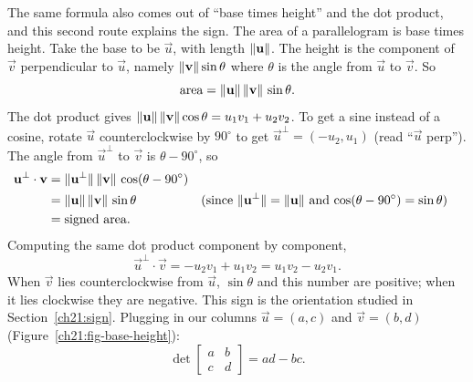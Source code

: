 The same formula also comes out of ``base times height'' and the dot product, and
this second route explains the sign. The area of a parallelogram is
base times height. Take the base to be $\vec u$, with length $\lVert\mathbf{u}\rVert$. The
height is the component of $\vec v$ perpendicular to $\vec u$, namely
$\lVert\mathbf{v}\rVert\sin\theta$ where $\theta$ is the angle from $\vec u$ to $\vec v$.
So
\[
  \text{area} = \lVert\mathbf{u}\rVert\,\lVert\mathbf{v}\rVert\,\sin\theta.
\]
The dot product gives $\lVert\mathbf{u}\rVert\,\lVert\mathbf{v}\rVert\cos\theta =
u_1 v_1 + u_2 v_2$. To get a sine instead of a cosine, rotate $\vec u$
counterclockwise by $90^\circ$ to get $\vec u^{\perp} = (-u_2, u_1)$ (read ``$\vec u$
perp''). The angle from $\vec u^\perp$ to $\vec v$ is $\theta - 90^\circ$, so
\begin{align*}
  \mathbf{u}^{\perp}\cdot \mathbf{v}
  &= \lVert\mathbf{u}^\perp\rVert\,\lVert\mathbf{v}\rVert\,\cos(\theta-90^\circ) \\
  &= \lVert\mathbf{u}\rVert\,\lVert\mathbf{v}\rVert\,\sin\theta
     && \text{(since $\lVert\mathbf{u}^\perp\rVert = \lVert\mathbf{u}\rVert$ and $\cos(\theta-90^\circ) = \sin\theta$)}\\
  &= \text{signed area}.
\end{align*}
Computing the same dot product
component by component,
\[
  \vec u^{\perp}\cdot \vec v = -u_2 v_1 + u_1 v_2 = u_1 v_2 - u_2 v_1 .
\]
When $\vec v$ lies counterclockwise from $\vec u$, $\sin\theta$ and this number are
positive; when it lies clockwise they are negative. This sign is the orientation
studied in Section~\ref{ch21:sign}. Plugging in our columns
$\vec u = (a,c)$ and $\vec v = (b,d)$ (Figure~\ref{ch21:fig-base-height}):
\[
  \boxed{\ \det\!\begin{bmatrix} a & b \\ c & d \end{bmatrix} = ad - bc.\ }
\]

